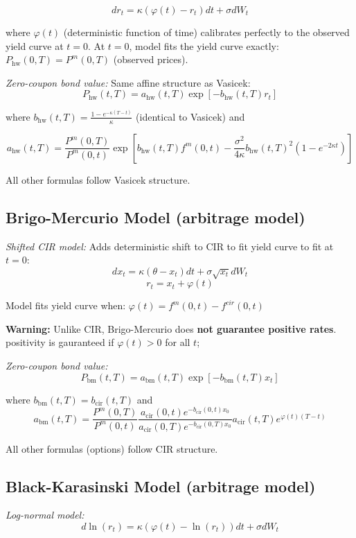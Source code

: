 \documentclass[12pt,a4paper]{article}
\begin{document}
$$dr_t = \kappa(\varphi(t) - r_t)dt + \sigma dW_t$$

where $\varphi(t)$ (deterministic function of time) calibrates perfectly to the observed yield curve at $t=0$. 
At $t=0$, model fits the yield curve exactly: $P_{\text{hw}}(0, T) = P^m(0,T)$ (observed prices).

\textit{Zero-coupon bond value:} Same affine structure as Vasicek:
$$P_{\text{hw}}(t,T) = a_{\text{hw}}(t,T)\exp[-b_{\text{hw}}(t,T)r_t]$$

where $b_{\text{hw}}(t,T) = \frac{1 - e^{-\kappa(T-t)}}{\kappa}$ (identical to Vasicek) and 

$$a_{\text{hw}}(t,T) = \frac{P^m(0,T)}{P^m(0,t)}\exp[b_{\text{hw}}(t,T)f^m(0,t) - \frac{\sigma^2}{4\kappa}b_{\text{hw}}(t,T)^2(1 - e^{-2\kappa t})]$$

All other formulas follow Vasicek structure.

\subsection{Brigo-Mercurio Model (arbitrage model)}

\textit{Shifted CIR model:} Adds deterministic shift to CIR to fit yield curve to fit at $t=0$:
$$dx_t = \kappa(\theta - x_t)dt + \sigma\sqrt{x_t}dW_t$$
$$r_t = x_t + \varphi(t)$$


Model fits yield curve when: $\varphi(t) = f^m(0,t) - f^{cir}(0,t)$

\textbf{Warning:} Unlike CIR, Brigo-Mercurio does \textbf{not guarantee positive rates}. positivity is gauranteed if $\varphi(t) > 0$ for all $t$;

\textit{Zero-coupon bond value:}
$$P_{\text{bm}}(t,T) = a_{\text{bm}}(t,T)\exp[-b_{\text{bm}}(t,T)x_t]$$

where $b_{\text{bm}}(t,T) = b_{\text{cir}}(t,T)$ and $$a_{\text{bm}}(t,T) = \frac{P^m(0,T)}{P^m(0,t)}\frac{a_{\text{cir}}(0,t)e^{-b_{\text{cir}}(0,t)x_0}}{a_{\text{cir}}(0,T)e^{-b_{\text{cir}}(0,T)x_0}}a_{\text{cir}}(t,T)e^{\varphi(t)(T-t)}$$

All other formulas (options) follow CIR structure.

\subsection{Black-Karasinski Model (arbitrage model)}

\textit{Log-normal model:}
$$d\ln(r_t) = \kappa(\varphi(t) - \ln(r_t))dt + \sigma dW_t$$
\end{document}

